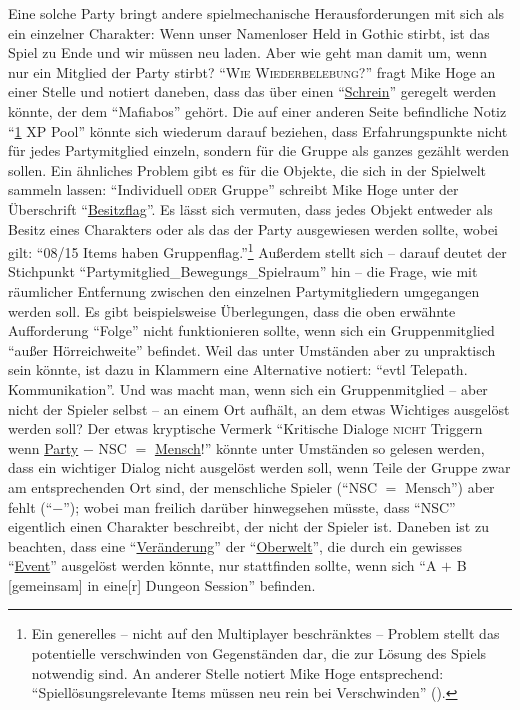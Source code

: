 \documentclass[a5paper,pagesize,numbers=noenddot]{scrbook}
\begin{document}
Eine solche Party bringt andere spielmechanische Herausforderungen mit sich als ein einzelner Charakter:
Wenn unser Namenloser Held in Gothic stirbt, ist das Spiel zu Ende und wir müssen neu laden.
Aber wie geht man damit um, wenn nur ein Mitglied der Party stirbt?
\enquote{\textsc{Wie Wiederbelebung?}} fragt Mike Hoge an einer Stelle und notiert daneben, dass das über einen \enquote{\uline{Schrein}} geregelt werden könnte, der dem \enquote{Mafiabos} gehört.\autocite[S.~7]{orpheus_b_scribbles}
Die auf einer anderen Seite befindliche Notiz \enquote{\uline{1} XP Pool}\autocite[S.~8]{orpheus_b_scribbles} könnte sich wiederum darauf beziehen, dass Erfahrungspunkte nicht für jedes Partymitglied einzeln, sondern für die Gruppe als ganzes gezählt werden sollen.
Ein ähnliches Problem gibt es für die Objekte, die sich in der Spielwelt sammeln lassen:
\enquote{Individuell \textsc{oder} Gruppe} schreibt Mike Hoge unter der Überschrift \enquote{\uline{Besitzflag}}.
Es lässt sich vermuten, dass jedes Objekt entweder als Besitz eines Charakters oder als das der Party ausgewiesen werden sollte, wobei gilt:
\enquote{08/15 Items haben Gruppenflag.}\autocite[S.~9]{orpheus_b_scribbles}\footnote{Ein generelles -- nicht auf den Multiplayer beschränktes -- Problem stellt das potentielle verschwinden von Gegenständen dar, die zur Lösung des Spiels notwendig sind.
An anderer Stelle notiert Mike Hoge entsprechend:
\enquote{Spiellösungsrelevante Items müssen neu rein bei Verschwinden} (\autocite[S.~7]{orpheus_b_scribbles}).}
Außerdem stellt sich -- darauf deutet der Stichpunkt \enquote{Partymitglied\_Bewegungs\_Spielraum}\autocite[S.~8]{orpheus_b_scribbles} hin -- die Frage, wie mit räumlicher Entfernung zwischen den einzelnen Partymitgliedern umgegangen werden soll.
Es gibt beispielsweise Überlegungen, dass die oben erwähnte Aufforderung \enquote{Folge} nicht funktionieren sollte, wenn sich ein Gruppenmitglied \enquote{außer Hörreichweite} befindet.
Weil das unter Umständen aber zu unpraktisch sein könnte, ist dazu in Klammern eine Alternative notiert:
\enquote{evtl Telepath. Kommunikation}.\autocite[S.~5]{orpheus_interface}
Und was macht man, wenn sich ein Gruppenmitglied -- aber nicht der Spieler selbst -- an einem Ort aufhält, an dem etwas Wichtiges ausgelöst werden soll?
Der etwas kryptische Vermerk \enquote{Kritische Dialoge \textsc{nicht} Triggern wenn \uline{Party} $-$ NSC $=$ \uline{Mensch}!}\autocite[S.~9]{orpheus_b_scribbles} könnte unter Umständen so gelesen werden, dass ein wichtiger Dialog nicht ausgelöst werden soll, wenn Teile der Gruppe zwar am entsprechenden Ort sind, der menschliche Spieler (\enquote{NSC $=$ Mensch}) aber fehlt (\enquote{$-$}); wobei man freilich darüber hinwegsehen müsste, dass \enquote{NSC} eigentlich einen Charakter beschreibt, der nicht der Spieler ist. %
Daneben ist zu beachten, dass eine \enquote{\uline{Veränderung}} der \enquote{\uline{Oberwelt}}, die durch ein gewisses \enquote{\uline{Event}} ausgelöst werden könnte, nur stattfinden sollte, wenn sich \enquote{A $+$ B [gemeinsam] in eine[r] Dungeon Session} befinden.\autocite[S.~8]{orpheus_b_scribbles}
\end{document}
